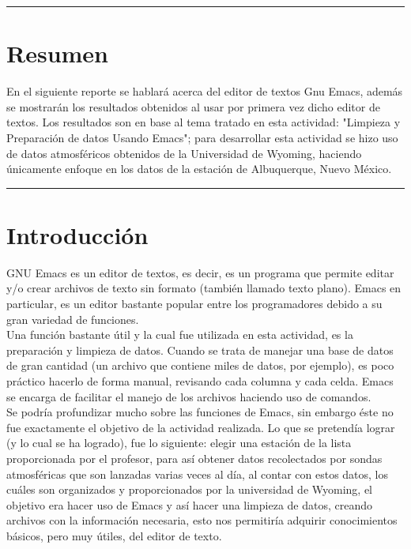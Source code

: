 \documentclass[12pt]{article}
\begin{document}
\begin{doublespace}

\hrule
\section*{Resumen}
En el siguiente reporte se hablará acerca del editor de textos Gnu Emacs, además se mostrarán los resultados obtenidos al usar por primera vez dicho editor de textos. Los resultados son en base al tema tratado en esta actividad: "Limpieza y Preparación de datos Usando Emacs"; para desarrollar esta actividad se hizo uso de datos atmosféricos obtenidos de la Universidad de Wyoming, haciendo únicamente enfoque en los datos de la estación de Albuquerque, Nuevo México.

\vspace{0.6 cm}
\hrule

\vspace{0.6 cm}

\section{Introducción}
GNU Emacs es un editor de textos, es decir, es un programa que permite editar y/o crear archivos de texto sin formato (también llamado texto plano). Emacs en particular, es un editor bastante popular entre los programadores debido a su gran variedad de funciones.
\\

Una función bastante útil y la cual fue utilizada en esta actividad, es la preparación y limpieza de datos. Cuando se trata de manejar una base de datos de gran cantidad (un archivo que contiene miles de datos, por ejemplo), es poco práctico hacerlo de forma manual, revisando cada columna y cada celda. Emacs se encarga de facilitar el manejo de los archivos haciendo uso de comandos.
\\

Se podría profundizar mucho sobre las funciones de Emacs, sin embargo éste no fue exactamente el objetivo de la actividad realizada. Lo que se pretendía lograr (y lo cual se ha logrado), fue lo siguiente: elegir una estación de la lista proporcionada por el profesor, para así obtener datos recolectados por sondas atmosféricas que son lanzadas varias veces al día, al contar con estos datos, los cuáles son organizados y proporcionados por la universidad de Wyoming, el objetivo era hacer uso de Emacs y así hacer una limpieza de datos, creando archivos con la información necesaria, esto nos permitiría adquirir conocimientos básicos, pero muy útiles, del editor de texto.


\end{doublespace}
\end{document}
